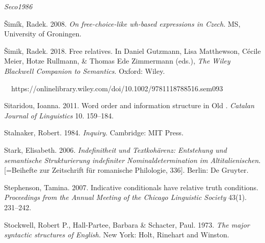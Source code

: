 \begin{styleStandard}
\emph{\textmd{Seco}}\emph{\textmd{1986}}
\end{styleStandard}

\begin{styleStandard}
Šimík, Radek. 2008. \textit{On free-choice-like wh-based expressions in Czech}. MS, University of Groningen.
\end{styleStandard}

\begin{styleStandard}
Šimik, Radek. 2018. Free relatives. In Daniel Gutzmann, Lisa Matthewson, Cécile Meier, Hotze Rullmann, \& Thomas Ede Zimmermann (eds.), \textit{The Wiley Blackwell Companion to Semantics}. Oxford: Wiley. 
\end{styleStandard}

\begin{styleStandard}
\ \ https://onlinelibrary.wiley.com/doi/10.1002/9781118788516.sem093
\end{styleStandard}

\begin{styleannotationtext}
Sitaridou, Ioanna. 2011. Word order and information structure in Old . \textit{Catalan Journal of Linguistics} 10. 159–184.
\end{styleannotationtext}

\begin{styleStandard}
Stalnaker, Robert. 1984. \textit{Inquiry}. Cambridge: MIT Press.
\end{styleStandard}

\begin{styleStandard}
Stark, Elisabeth. 2006. \textit{Indefinitheit und Textkohärenz: Entstehung und semantische Strukturierung indefiniter Nominaldetermination im Altitalienischen}. [=Beihefte zur Zeitschrift für romanische Philologie, 336]. Berlin: De Gruyter.
\end{styleStandard}

\begin{styleStandard}
Stephenson, Tamina. 2007. Indicative conditionals have relative truth conditions. \textit{Proceedings from the Annual Meeting of the Chicago Linguistic Society} 43(1). 231–242.
\end{styleStandard}

\begin{styleStandard}
Stockwell, Robert P., Hall-Partee, Barbara \& Schacter, Paul. 1973. \textit{The major syntactic structures of English.} New York: Holt, Rinehart and Winston.
\end{styleStandard}

